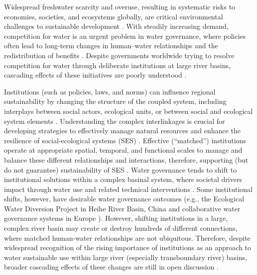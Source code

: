 Widespread freshwater scarcity and overuse, resulting in systematic risks to economies, societies, and ecosystems globally, are critical environmental challenges to sustainable development \cite{distefano2017, dolan2021, xu2020b, mekonnen2016}.
With steadily increasing demand, competition for water is an urgent problem in water governance, where policies often lead to long-term changes in human–water relationships and the redistribution of benefits \cite{gleick2010, ziolkowska2016, wang2019d}.
Despite governments worldwide trying to resolve competition for water through deliberate institutions at large river basins, cascading effects of these initiatives are poorly understood \cite{giuliani2013, falkenmark2019, jaeger2019}.

Institutions (such as policies, laws, and norms) can influence regional sustainability by changing the structure of the coupled system, including interplays between social actors, ecological units, or between social and ecological system elements \cite{young2008,cumming2020b,lien2020, bodin2017b}.
Understanding the complex interlinkages is crucial for developing strategies to effectively manage natural resources and enhance the resilience of social-ecological systems (SES) \cite{kluger2020}.
Effective (“matched”) institutions operate at appropriate spatial, temporal, and functional scales to manage and balance these different relationships and interactions, therefore, supporting (but do not guarantee) sustainability of SES \cite{epstein2015, wang2019d}.
Water governance tends to shift to institutional solutions within a complex basinal system, where societal drivers impact through water use and related technical interventions \cite{fischer2020}.
Some institutional shifts, however, have desirable water governance outcomes (e.g., the Ecological Water Diversion Project in Heihe River Basin, China \cite{wang2019d} and collaborative water governance systems in Europe \cite{green2013}).
However, shifting institutions in a large, complex river basin may create or destroy hundreds of different connections, where matched human-water relationships are not ubiquitous.
Therefore, despite widespread recognition of the rising importance of institutions as an approach to water sustainable use within large river (especially transboundary river) basins, broader cascading effects of these changes are still in open discussion \cite{agrawal2003, persha2011, agrawal2001}.

